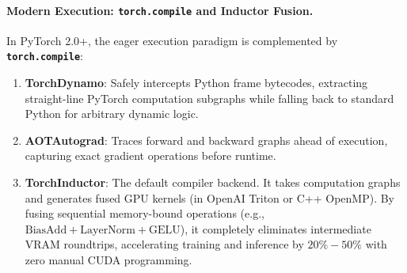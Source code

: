 \documentclass[11pt,a4paper]{article}
\begin{document}
\paragraph{Modern Execution: \texttt{torch.compile} and Inductor Fusion.}
In PyTorch 2.0+, the eager execution paradigm is complemented by \textbf{\texttt{torch.compile}}:
\begin{enumerate}
    \item \textbf{TorchDynamo}: Safely intercepts Python frame bytecodes, extracting straight-line PyTorch computation subgraphs while falling back to standard Python for arbitrary dynamic logic.
    \item \textbf{AOTAutograd}: Traces forward and backward graphs ahead of execution, capturing exact gradient operations before runtime.
    \item \textbf{TorchInductor}: The default compiler backend. It takes computation graphs and generates fused GPU kernels (in OpenAI Triton or C++ OpenMP). By fusing sequential memory-bound operations (e.g., $\text{BiasAdd} + \text{LayerNorm} + \text{GELU}$), it completely eliminates intermediate VRAM roundtrips, accelerating training and inference by $20\%-50\%$ with zero manual CUDA programming.
\end{enumerate}
\end{document}
